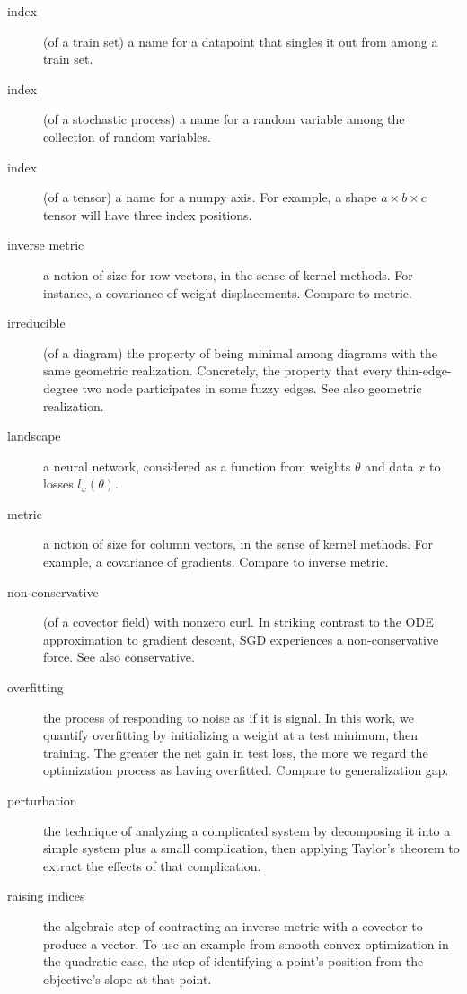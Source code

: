 \documentclass{article}
\theoremstyle{plain}
\theoremstyle{definition}
\begin{document}
\begin{description}
        \item[index] (of a train set) a name for a datapoint that singles it out from among a train set.
        \item[index] (of a stochastic process) a name for a random variable among the collection of random variables.
        \item[index] (of a tensor) a name for a numpy axis.  For example, a shape $a\times b\times c$ tensor will have three index positions. 
        \item[inverse metric] a notion of size for row vectors, in the sense of kernel methods.  For instance, a covariance of weight displacements.  Compare to metric.
        \item[irreducible] (of a diagram) the property of being minimal among diagrams with the same geometric realization.  Concretely, the property that every thin-edge-degree two node participates in some fuzzy edges.  See also geometric realization. 
        \item[landscape] a neural network, considered as a function from weights $\theta$ and data $x$ to losses $l_x(\theta)$. 
        \item[metric] a notion of size for column vectors, in the sense of kernel methods.  For example, a covariance of gradients.  Compare to inverse metric.
        \item[non-conservative] (of a covector field) with nonzero curl.  In striking contrast to the ODE approximation to gradient descent, SGD experiences a non-conservative force.  See also conservative.
        \item[overfitting] the process of responding to noise as if it is signal.  In this work, we quantify overfitting by initializing a weight at a test minimum, then training.  The greater the net gain in test loss, the more we regard the optimization process as having overfitted.  Compare to generalization gap.
        \item[perturbation] the technique of analyzing a complicated system by decomposing it into a simple system plus a small complication, then applying Taylor's theorem to extract the effects of that complication.  
        \item[raising indices] the algebraic step of contracting an inverse metric with a covector to produce a vector.  To use an example from smooth convex optimization in the quadratic case, the step of identifying a point's position from the objective's slope at that point.

\end{description}
\end{document}
